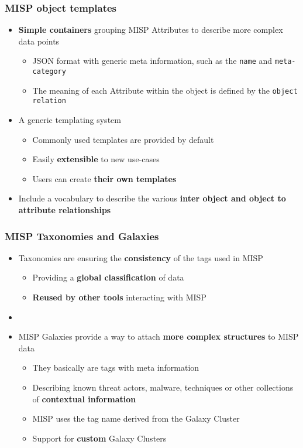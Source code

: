 \begin{frame}
    \frametitle{MISP object templates}
    \begin{itemize}
        \item \textbf{Simple containers} grouping MISP Attributes to describe more complex data points
        \begin{itemize}
            \item JSON format with generic meta information, such as the \texttt{name} and \texttt{meta-category}
            \item The meaning of each Attribute within the object is defined by the \texttt{object relation}
        \end{itemize}
        \item A generic templating system
        \begin{itemize}
            \item Commonly used templates are provided by default
            \item Easily \textbf{extensible} to new use-cases
            \item Users can create \textbf{their own templates}
        \end{itemize}
        \item Include a vocabulary to describe the various \textbf{inter object and object to attribute relationships}
    \end{itemize}
\end{frame}

\begin{frame}
    \frametitle{MISP Taxonomies and Galaxies}
    \begin{itemize}
        \item Taxonomies are ensuring the \textbf{consistency} of the tags used in MISP
        \begin{itemize}
            \item Providing a \textbf{global classification} of data
            \item \textbf{Reused by other tools} interacting with MISP
        \end{itemize}
        \item []
        \item MISP Galaxies provide a way to attach \textbf{more complex structures} to MISP data
        \begin{itemize}
            \item They basically are tags with meta information
            \item Describing known threat actors, malware, techniques or other collections of \textbf{contextual information}
            \item MISP uses the tag name derived from the Galaxy Cluster
            \item Support for \textbf{custom} Galaxy Clusters
        \end{itemize}
    \end{itemize}
\end{frame}

